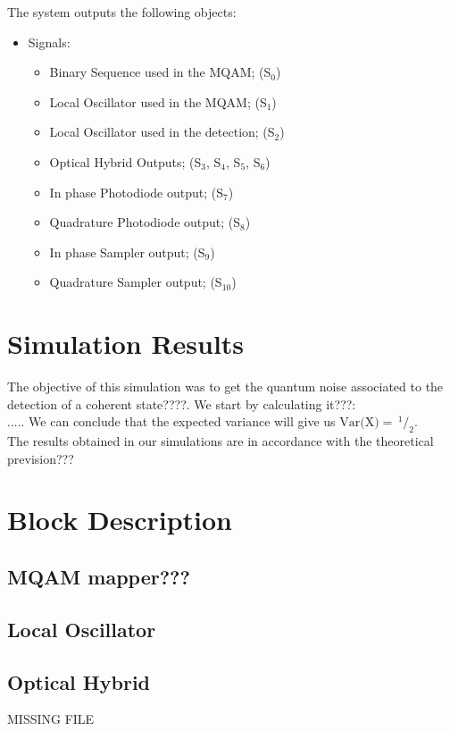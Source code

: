 \documentclass[a4paper]{article}
\newcommand{\slantfrac}[2]{\,^{#1}\!/_{#2}}
\begin{document}
The system outputs the following objects:
\begin{itemize}
\item Signals:
\begin{itemize}
\item Binary Sequence used in the MQAM; (S$_{0}$)
\item Local Oscillator used in the MQAM; (S$_{1}$)
\item Local Oscillator used in the detection; (S$_{2}$)
\item Optical Hybrid Outputs; (S$_{3}$, S$_{4}$, S$_{5}$, S$_{6}$)
\item In phase Photodiode output; (S$_{7}$)
\item Quadrature Photodiode output; (S$_{8}$)
\item In phase Sampler output; (S$_{9}$)
\item Quadrature Sampler output; (S$_{10}$)
\end{itemize}
\end{itemize}	

\section{Simulation Results}\label{subsec:SHresults}

The objective of this simulation was to get the quantum noise associated to the detection of a coherent state????. We start by calculating it???:
\\
.....
We can conclude that the expected variance will give us $\textrm{Var(X)} = \slantfrac{1}{2}$.\\
The results obtained in our simulations are in accordance with the theoretical prevision???


\section{Block Description}

\subsection{MQAM mapper???}


\subsection{Local Oscillator}


\subsection{Optical Hybrid}
MISSING FILE\\
%
\end{document}
